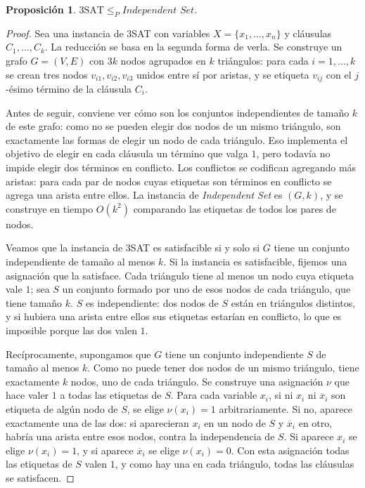 \documentclass[12pt, spanish, oneside, openany]{book}
\newcommand{\redp}{\le_{P}}
\newcommand{\prob}[1]{\textit{#1}}
\newcommand{\IS}{\prob{Independent Set}\xspace}
\newcommand{\nega}[1]{\overline{#1}} %
\theoremstyle{uprightplain}
\newtheorem{proposicion}[teorema]{Proposición}
\theoremstyle{definition}
\theoremstyle{remark}
\theoremstyle{definition}
\begin{document}
\begin{proposicion}
\label{prop:np-3sat-is}
$3\mathrm{SAT}\redp\IS$.
\end{proposicion}
\begin{proof}
Sea una instancia de 3SAT con variables $X=\{x_1,\dots,x_n\}$ y cláusulas $C_1,\dots,C_k$. La reducción se basa en la segunda forma de verla. Se construye un grafo $G=(V,E)$ con $3k$ nodos agrupados en $k$ triángulos: para cada $i=1,\dots,k$ se crean tres nodos $v_{i1},v_{i2},v_{i3}$ unidos entre sí por aristas, y se etiqueta $v_{ij}$ con el $j$-ésimo término de la cláusula $C_i$.

Antes de seguir, conviene ver cómo son los conjuntos independientes de tamaño $k$ de este grafo: como no se pueden elegir dos nodos de un mismo triángulo, son exactamente las formas de elegir un nodo de cada triángulo. Eso implementa el objetivo de elegir en cada cláusula un término que valga $1$, pero todavía no impide elegir dos términos en conflicto. Los conflictos se codifican agregando más aristas: para cada par de nodos cuyas etiquetas son términos en conflicto se agrega una arista entre ellos. La instancia de \IS es $(G,k)$, y se construye en tiempo $O(k^2)$ comparando las etiquetas de todos los pares de nodos.

Veamos que la instancia de 3SAT es satisfacible si y solo si $G$ tiene un conjunto independiente de tamaño al menos $k$. Si la instancia es satisfacible, fijemos una asignación que la satisface. Cada triángulo tiene al menos un nodo cuya etiqueta vale $1$; sea $S$ un conjunto formado por uno de esos nodos de cada triángulo, que tiene tamaño $k$. $S$ es independiente: dos nodos de $S$ están en triángulos distintos, y si hubiera una arista entre ellos sus etiquetas estarían en conflicto, lo que es imposible porque las dos valen $1$.

Recíprocamente, supongamos que $G$ tiene un conjunto independiente $S$ de tamaño al menos $k$. Como no puede tener dos nodos de un mismo triángulo, tiene exactamente $k$ nodos, uno de cada triángulo. Se construye una asignación $\nu$ que hace valer $1$ a todas las etiquetas de $S$. Para cada variable $x_i$, si ni $x_i$ ni $\nega{x}_i$ son etiqueta de algún nodo de $S$, se elige $\nu(x_i)=1$ arbitrariamente. Si no, aparece exactamente una de las dos: si aparecieran $x_i$ en un nodo de $S$ y $\nega{x}_i$ en otro, habría una arista entre esos nodos, contra la independencia de $S$. Si aparece $x_i$ se elige $\nu(x_i)=1$, y si aparece $\nega{x}_i$ se elige $\nu(x_i)=0$. Con esta asignación todas las etiquetas de $S$ valen $1$, y como hay una en cada triángulo, todas las cláusulas se satisfacen.
\end{proof}
\end{document}
